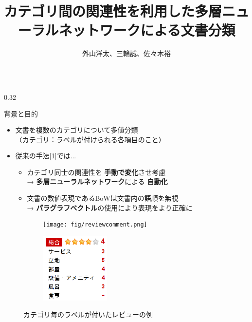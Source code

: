 \documentclass[10pt,unicode]{beamer}
\title{カテゴリ間の関連性を利用した多層ニューラルネットワークによる文書分類}
\author{外山洋太、三輪誠、佐々木裕}
\institute{豊田工業大学 工学部 先端工学基礎学科}
\date{}
\newcommand{\columnsize}{0.32}
\newcommand{\arrow}{{\color{ttiblue} →}\hspace{1ex}}
\newcommand{\notable}[1]{\textbf{\color{orange} #1}}
\newcommand{\keyword}[1]{\textbf{\color{red} #1}}
\begin{document}
\begin{frame}{}
\maketitle
\begin{columns}[t]

\begin{column}{\columnsize\textwidth} %
  \begin{block}{背景と目的}
    \begin{itemize}
      \item 文書を複数のカテゴリについて多値分類 \\
      （カテゴリ：ラベルが付けられる各項目のこと）
      \item 従来の手法[1]では...
        \begin{itemize}
        \item カテゴリ同士の関連性を\notable{手動で変化}させ考慮 \\
          \arrow \keyword{多層ニューラルネットワーク}による\notable{自動化}
        \item 文書の数値表現であるBoWは文書内の語順を無視 \\
          \arrow \keyword{パラグラフベクトル}の使用により表現をより正確に
        \end{itemize}
    \end{itemize}
  \end{block}

  \begin{figure}
    \begin{subfigure}{0.55\columnwidth}
      \texttt{[image: fig/reviewcomment.png]}
    \end{subfigure}
    \begin{subfigure}{0.35\columnwidth}
      \includegraphics[width=\textwidth]{fig/reviewpoints.png}
    \end{subfigure}
    \caption{カテゴリ毎のラベルが付いたレビューの例}
  \end{figure}


\end{column}
\end{columns}
\end{frame}
\end{document}
